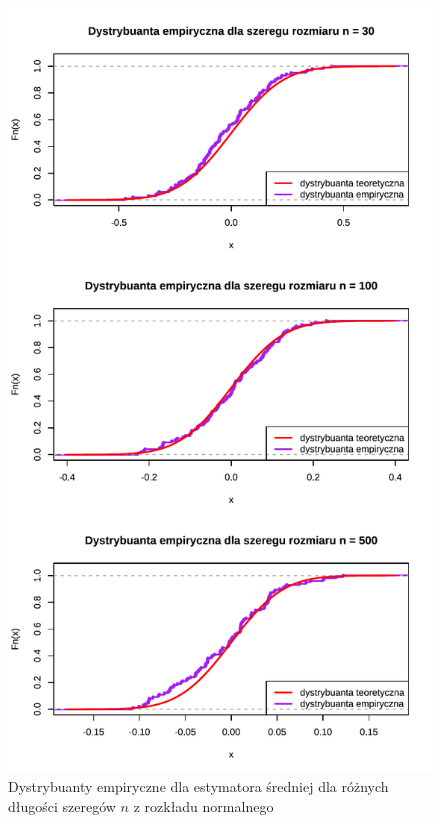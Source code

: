\documentclass[10pt, a4paper]{article}\usepackage[]{graphicx}\usepackage[]{xcolor}
\makeatletter
\def\maxwidth{ %
  \ifdim\Gin@nat@width>\linewidth
    \linewidth
  \else
    \Gin@nat@width
  \fi
}
\newenvironment{knitrout}{}{} %
\makeatother
\begin{document}
\begin{knitrout}
\color{fgcolor}\begin{figure}[H]

{\centering \includegraphics[width=\maxwidth]{figure/analiza-sredniej-norm-dystr-emp-1} 

}

\caption[Dystrybuanty empiryczne dla estymatora średniej dla różnych długości szeregów $n$ z rozkładu normalnego]{Dystrybuanty empiryczne dla estymatora średniej dla różnych długości szeregów $n$ z rozkładu normalnego}\label{fig:analiza-sredniej-norm-dystr-emp}
\end{figure}

\end{knitrout}
\end{document}
